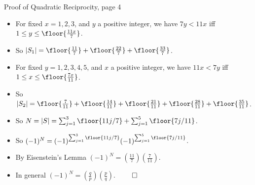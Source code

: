 \documentclass[handout]{beamer}
\begin{document}

\begin{frame}{Proof of Quadratic Reciprocity, page 4}

\begin{itemize}
  \item For fixed $x=1,2,3$, and $y$ a positive integer, we have $7y < 11x$ iff $1\leq y\leq\floor{\frac{11x}{7}}$.
  \item So $|S_1|= \floor{\frac{11}{7}} + \floor{\frac{22}{7}} + \floor{\frac{33}{7}}$.
  \item For fixed $y=1,2,3,4,5$, and $x$ a positive integer, we have $11x < 7y$ iff $1\leq x\leq\floor{\frac{7x}{11}}$.
  \item So $|S_2|= \floor{\frac{7}{11}} + \floor{\frac{14}{11}} + \floor{\frac{21}{11}} + \floor{\frac{28}{11}} + \floor{\frac{35}{11}}$.
  \item So $N = |S| = \sum_{j=1}^{3} \floor{11j/7} + \sum_{j=1}^{5} \floor{7j/11}$.
  \item So $(-1)^N = (-1)^{\sum_{j=1}^{3} \floor{11j/7} } (-1)^{\sum_{j=1}^{5} \floor{7j/11} }$.
  \item By Eisenstein's Lemma $(-1)^N = (\frac{11}{7})(\frac{7}{11})$.
  \item In general $(-1)^N = (\frac{q}{p})(\frac{p}{q})$. $\qed$
\end{itemize}
\end{frame}

\end{document}
